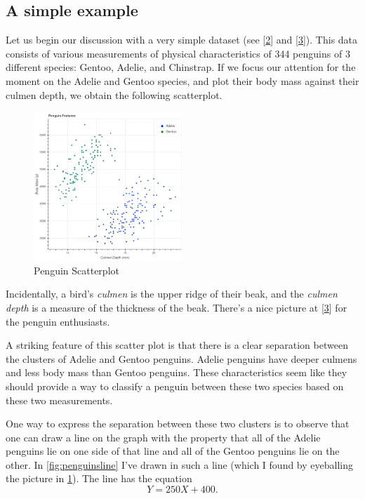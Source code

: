 \documentclass[
]{article}
\begin{document}
\hypertarget{a-simple-example}{%
\subsection{A simple example}\label{a-simple-example}}

Let us begin our discussion with a very simple dataset (see
{[}\protect\hyperlink{ref-penguins}{2}{]} and
{[}\protect\hyperlink{ref-penguindata}{3}{]}). This data consists of
various measurements of physical characteristics of 344 penguins of 3
different species: Gentoo, Adelie, and Chinstrap. If we focus our
attention for the moment on the Adelie and Gentoo species, and plot
their body mass against their culmen depth, we obtain the following
scatterplot.

\begin{figure}
\hypertarget{fig:penguins}{%
\centering
\includegraphics[width=0.5\textwidth,height=\textheight]{../img/penguins.png}
\caption{Penguin Scatterplot}\label{fig:penguins}
}
\end{figure}

Incidentally, a bird's \emph{culmen} is the upper ridge of their beak,
and the \emph{culmen depth} is a measure of the thickness of the beak.
There's a nice picture at {[}\protect\hyperlink{ref-penguindata}{3}{]}
for the penguin enthusiasts.

A striking feature of this scatter plot is that there is a clear
separation between the clusters of Adelie and Gentoo penguins. Adelie
penguins have deeper culmens and less body mass than Gentoo penguins.
These characteristics seem like they should provide a way to classify a
penguin between these two species based on these two measurements.

One way to express the separation between these two clusters is to
observe that one can draw a line on the graph with the property that all
of the Adelie penguins lie on one side of that line and all of the
Gentoo penguins lie on the other. In \cref{fig:penguinsline} I've drawn
in such a line (which I found by eyeballing the picture in
\cref{fig:penguins}). The line has the equation \[
Y = 250X+400.
\]
\end{document}
